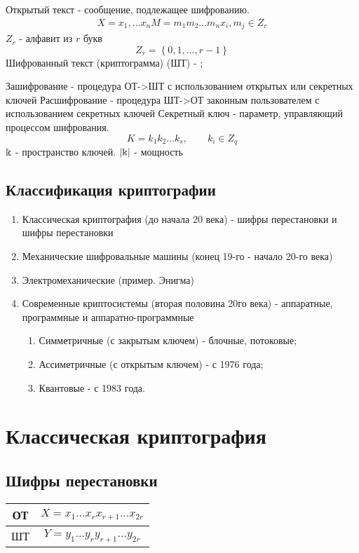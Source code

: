 Открытый текст - сообщение, подлежащее шифрованию.
\begin{eqnarray}
	X = x_1, ... x_n
	M = m_1m_2...m_n
	x_i, m_j \in Z_r
\end{eqnarray}
$ Z_r $ - алфавит из $ r $ букв
\begin{equation}
	Z_r = \left\lbrace 0,1,...,r-1 \right\rbrace 
\end{equation}
Шифрованный текст (криптограмма) (ШТ) - ;


Зашифрование - процедура ОТ->ШТ с использованием открытых или секретных ключей
Расшифрование - процедура ШТ->ОТ законным пользователем с использованием секретных ключей
Секретный ключ - параметр, управляющий процессом шифрования.
\begin{equation}
	K = k_1k_2...k_s, \qquad k_i \in Z_q
\end{equation}
$ \Bbbk $ - пространство ключей.
$ |\Bbbk| $ - мощность

\subsection{Классификация криптографии}
\begin{enumerate}
	\item Классическая криптография (до начала 20 века) - шифры перестановки и шифры перестановки
	\item Механические шифровальные машины (конец 19-го - начало 20-го века)
	\item Электромеханические (пример. Энигма)
	\item Современные криптосистемы (вторая половина 20го века) - аппаратные, программные и аппаратно-программные
	\begin{enumerate}
		\item Симметричные (с закрытым ключем) - блочные, потоковые;
		\item Ассиметричные (с открытым ключем) - с 1976 года;
		\item Квантовые - с 1983 года.
	\end{enumerate}
\end{enumerate}

\section{Классическая криптография}
\subsection{Шифры перестановки}
\begin{tabular}{|c|c|}
	\hline 
	ОТ & $ X = x_1...x_rx_{r+1} ... x_{2r} $ \\ 
	\hline 
	ШТ & $ Y = y_1...y_ry_{r+1} ... y_{2r} $ \\ 
	\hline 
\end{tabular} 

